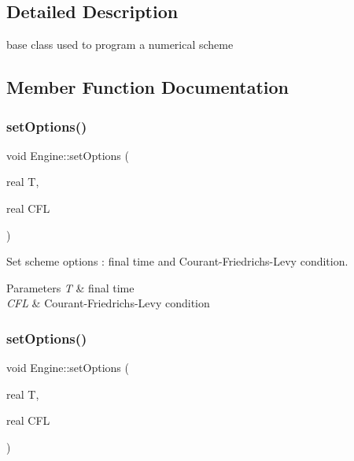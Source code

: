 \subsection{Detailed Description}
base class used to program a numerical scheme 

\subsection{Member Function Documentation}
\mbox{\label{classEngine_a6837cf148e122390a924718435cea117}} 
\subsubsection{\texorpdfstring{set\+Options()}{setOptions()}\hspace{0.1cm}{\footnotesize\ttfamily [1/2]}}
{\footnotesize\ttfamily void Engine\+::set\+Options (\begin{DoxyParamCaption}\item[{real}]{T,  }\item[{real}]{C\+FL }\end{DoxyParamCaption})}



Set scheme options \+: final time and Courant-\/\+Friedrichs-\/\+Levy condition. 


\begin{DoxyParams}{Parameters}
{\em T} & final time \\
\hline
{\em C\+FL} & Courant-\/\+Friedrichs-\/\+Levy condition \\
\hline
\end{DoxyParams}
\mbox{\label{classEngine_a6837cf148e122390a924718435cea117}} 
\subsubsection{\texorpdfstring{set\+Options()}{setOptions()}\hspace{0.1cm}{\footnotesize\ttfamily [2/2]}}
{\footnotesize\ttfamily void Engine\+::set\+Options (\begin{DoxyParamCaption}\item[{real}]{T,  }\item[{real}]{C\+FL }\end{DoxyParamCaption})}




